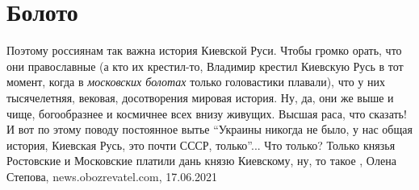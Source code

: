  
 
 
 
 
\chapter{Болото}

Поэтому россиянам так важна история Киевской Руси. Чтобы громко орать, что они
православные (а кто их крестил-то, Владимир крестил Киевскую Русь в тот момент,
когда в \emph{московских болотах} только головастики плавали), что у них тысячелетняя,
вековая, досотворения мировая история. Ну, да, они же выше и чище, богообразнее
и космичнее всех внизу живущих. Высшая раса, что сказать!  И вот по этому
поводу постоянное вытье \enquote{Украины никогда не было, у нас общая история, Киевская
Русь, это почти СССР, только}... Что только? Только князья Ростовские и
Московские платили дань князю Киевскому, ну, то такое
, 
Олена Степова, news.obozrevatel.com, 17.06.2021
